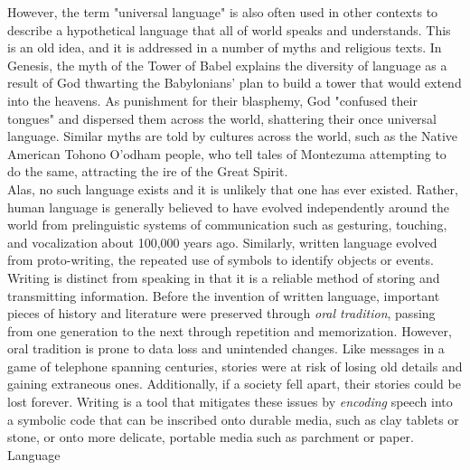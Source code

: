 

However, the term "universal language" is also often used in other contexts to describe a hypothetical language that all of world speaks and understands. This is an old idea, and it is addressed in a number of myths and religious texts. In Genesis, the myth of the Tower of Babel explains the diversity of language as a result of God thwarting the Babylonians' plan to build a tower that would extend into the heavens. As punishment for their blasphemy, God "confused their tongues" and dispersed them across the world, shattering their once universal language. Similar myths are told by cultures across the world, such as the Native American Tohono O'odham people, who tell tales of Montezuma attempting to do the same, attracting the ire of the Great Spirit. \\

Alas, no such language exists and it is unlikely that one has ever existed. Rather, human language is generally believed to have evolved independently around the world from prelinguistic systems of communication such as gesturing, touching, and vocalization about 100,000 years ago. Similarly, written language evolved from proto-writing, the repeated use of symbols to identify objects or events. \\

Writing is distinct from speaking in that it is a reliable method of storing and transmitting information. Before the invention of written language, important pieces of history and literature were preserved through \textit{oral tradition}, passing from one generation to the next through repetition and memorization. However, oral tradition is prone to data loss and unintended changes. Like messages in a game of telephone spanning centuries, stories were at risk of losing old details and gaining extraneous ones. Additionally, if a society fell apart, their stories could be lost forever. Writing is a tool that mitigates these issues by \textit{encoding} speech into a symbolic code that can be inscribed onto durable media, such as clay tablets or stone, or onto more delicate, portable media such as parchment or paper. \\

Language  \\

